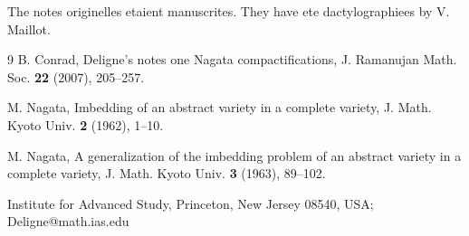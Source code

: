 \documentclass[11pt,a4paper]{article}
\theoremstyle{plain}
\theoremstyle{definition}
\begin{document}
The notes originelles etaient manuscrites. They have ete dactylographiees by V. Maillot.

\begin{thebibliography}{9}
B. Conrad, Deligne's notes one Nagata compactifications, J. Ramanujan Math. Soc. \textbf{22} (2007), 205--257.

M. Nagata, Imbedding of an abstract variety in a complete variety, J. Math. Kyoto Univ. \textbf{2} (1962), 1--10.

M. Nagata, A generalization of the imbedding problem of an abstract variety in a complete variety, J. Math. Kyoto Univ. \textbf{3} (1963), 89--102.
\end{thebibliography}

\bigskip
\noindent Institute for Advanced Study, Princeton, New Jersey 08540, USA;
Deligne@math.ias.edu
\end{document}
